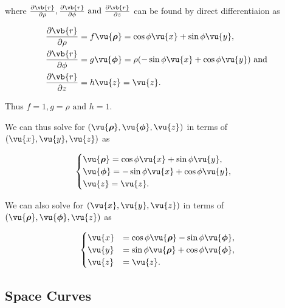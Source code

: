 \documentclass[english,a4paper,12pt]{report}
\begin{document}
where \(\frac{\partial \vb{r} }{\partial \rho }, \frac{\partial \vb{r} }{\partial \phi } \text { and } \frac{\partial \vb{r} }{\partial z} \) can be found by direct differentiaion as 

\begin{equation}
	\begin{aligned} 
		\frac{\partial \vb{r} }{\partial \rho }  &= f \vu{\boldsymbol{\rho } } = \cos{\phi}\vu{x} + \sin{\phi}\vu{y}, \\
		\frac{\partial \vb{r} }{\partial \phi }  &= g \vu{\boldsymbol{\phi } } = \rho (-\sin{\phi}\vu{x} + \cos{\phi}\vu{y}) \text { and }  \\
		\frac{\partial \vb{r} }{\partial z }  &= h \vu{z} = \vu{z}. 
	\end{aligned} 
\end{equation}

Thus \(f = 1, g = \rho  \text { and }  h = 1\). 

We can thus solve for \((\vu{\boldsymbol{\rho } }, \vu{\boldsymbol{\phi } }, \vu{z} )\) in terms of \((\vu{x} ,\vu{y} ,\vu{z} )\) as

\begin{equation}
    \begin{cases} 
        \vu{\boldsymbol{\rho } } = \cos \phi \vu{x} + \sin \phi \vu{y}, \\
        \vu{\boldsymbol{\phi } } = -\sin \phi \vu{x} + \cos \phi \vu{y}, \\
        \vu{z} = \vu{z}.
        \end{cases}
\end{equation}



We can also solve for \((\vu{x} , \vu{y}, \vu{z} )\) in terms of \((\vu{\boldsymbol{\rho } }, \vu{\boldsymbol{\phi } }, \vu{z} )\) as  

\begin{equation}
    \begin{cases}
        \vu{x} &= \cos \phi  \vu{\boldsymbol{\rho } } - \sin \phi \vu{\boldsymbol{\phi } }, \\
        \vu{y} &= \sin \phi \vu{\boldsymbol{\rho } } + \cos \phi \vu{\boldsymbol{\phi } }, \\
        \vu{z} &= \vu{z}. 
        \end{cases}
\end{equation}

\subsection{Space Curves}
\end{document}

